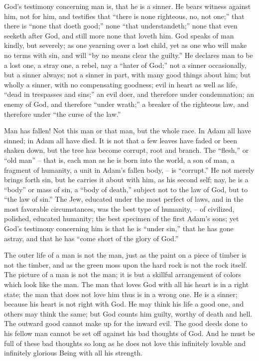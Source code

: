\documentclass[
]{book}
\begin{document}
God's testimony concerning man is, that he is a sinner. He bears witness against him, not for him, and testifies that ``there is none righteous, no, not one;'' that there is ``none that doeth good;'' none ``that understandeth;'' none that even seeketh after God, and still more none that loveth him. God speaks of man kindly, but severely; as one yearning over a lost child, yet as one who will make no terms with sin, and will ``by no means clear the guilty.'' He declares man to be a lost one, a stray one, a rebel, nay a ``hater of God;'' not a sinner occasionally, but a sinner always; not a sinner in part, with many good things about him; but wholly a sinner, with no compensating goodness; evil in heart as well as life, ``dead in trespasses and sins;'' an evil doer, and therefore under condemnation; an enemy of God, and therefore ``under wrath;'' a breaker of the righteous law, and therefore under ``the curse of the law.''

Man has fallen! Not this man or that man, but the whole race. In Adam all have sinned; in Adam all have died. It is not that a few leaves have faded or been shaken down, but the tree has become corrupt, root and branch. The ``flesh,'' or ``old man'' -- that is, each man as he is born into the world, a son of man, a fragment of humanity, a unit in Adam's fallen body, -- is ``corrupt.'' He not merely brings forth sin, but he carries it about with him, as his second self; nay, he is a ``body'' or mass of sin, a ``body of death,'' subject not to the law of God, but to ``the law of sin.'' The Jew, educated under the most perfect of laws, and in the most favorable circumstances, was the best type of humanity, -- of civilized, polished, educated humanity; the best specimen of the first Adam's sons; yet God's testimony concerning him is that he is ``under sin,'' that he has gone astray, and that he has ``come short of the glory of God.''

The outer life of a man is not the man, just as the paint on a piece of timber is not the timber, and as the green moss upon the hard rock is not the rock itself. The picture of a man is not the man; it is but a skillful arrangement of colors which look like the man. The man that loves God with all his heart is in a right state; the man that does not love him thus is in a wrong one. He is a sinner; because his heart is not right with God. He may think his life a good one, and others may think the same; but God counts him guilty, worthy of death and hell. The outward good cannot make up for the inward evil. The good deeds done to his fellow man cannot be set off against his bad thoughts of God. And he must be full of these bad thoughts so long as he does not love this infinitely lovable and infinitely glorious Being with all his strength.
\end{document}
